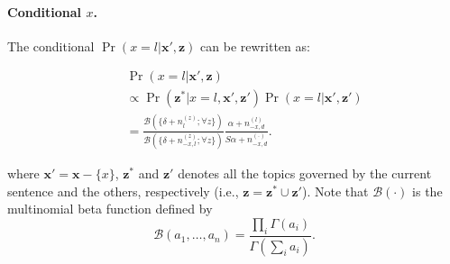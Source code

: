 \paragraph{Conditional $x$.}  The conditional $\Pr(x =
l|\mathbf{x}',\mathbf{z})$ can be rewritten as: 
\begin{small}
\begin{eqnarray*}
  && \Pr(x = l|\mathbf{x}',\mathbf{z}) \nonumber\\
  && \propto \Pr(\mathbf{z}^*|x = l, \mathbf{x}', \mathbf{z}') \Pr(x = l |\mathbf{x}',\mathbf{z}') \\
  && = \frac{\mathcal{B}(\{\delta + n_l^{(z)}; \forall z\})}{\mathcal{B}(\{\delta + n_{-x,l}^{(z)}; \forall z\})}
  \frac{\alpha + n_{-x,d}^{(l)}}{S \alpha + n_{-x,d}^{(\cdot)}}.
\end{eqnarray*}
\end{small}
where $\mathbf{x}' =
\mathbf{x} - \{x\}$, $\mathbf{z}^*$ and $\mathbf{z}'$ denotes all the topics
governed by the current sentence and the others, respectively (i.e.,
$\mathbf{z} = \mathbf{z}^* \cup \mathbf{z}'$).
Note that $\mathcal{B}(\cdot)$ is the multinomial beta function defined by
\[\mathcal{B}(a_1, \ldots, a_n) = \frac{\prod_i \Gamma(a_i)}{\Gamma(\sum_i
a_i)}. \]

